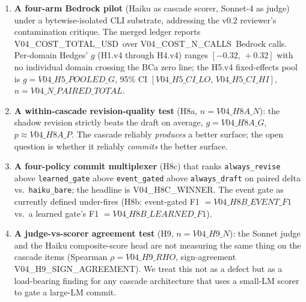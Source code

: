 \begin{enumerate}[leftmargin=2em,itemsep=2pt,topsep=2pt]
\item \textbf{A four-arm Bedrock pilot} (Haiku as cascade scorer, Sonnet-4 as judge) under a bytewise-isolated CLI substrate, addressing the v0.2 reviewer's contamination critique. The merged ledger reports {V04\_COST\_TOTAL\_USD}~over {V04\_COST\_N\_CALLS}~Bedrock calls. Per-domain Hedges' $g$ (H1.v4 through H4.v4) ranges $[-0.32,\,+0.32]$ with no individual domain crossing the BCa zero line; the H5.v4 fixed-effects pool is $g={V04\_H5\_POOLED\_G}$, 95\% CI $[{V04\_H5\_CI\_LO},\,{V04\_H5\_CI\_HI}]$, $n={V04\_N\_PAIRED\_TOTAL}$.
\item \textbf{A within-cascade revision-quality test} (H8a, $n={V04\_H8A\_N}$): the shadow revision strictly beats the draft on average, $g={V04\_H8A\_G}$, $p\approx{V04\_H8A\_P}$. The cascade reliably \emph{produces} a better surface; the open question is whether it reliably \emph{commits} the better surface.
\item \textbf{A four-policy commit multiplexer} (H8c) that ranks \texttt{always\_revise} above \texttt{learned\_gate} above \texttt{event\_gated} above \texttt{always\_draft} on paired delta vs.\ \texttt{haiku\_bare}; the headline is {V04\_H8C\_WINNER}. The  event gate as currently defined under-fires (H8b: event-gated F1 $={V04\_H8B\_EVENT\_F1}$ vs.\ a learned gate's F1 $={V04\_H8B\_LEARNED\_F1}$).
\item \textbf{A judge-vs-scorer agreement test} (H9, $n={V04\_H9\_N}$): the Sonnet judge and the Haiku composite-score head are not measuring the same thing on the cascade items (Spearman $\rho={V04\_H9\_RHO}$, sign-agreement {V04\_H9\_SIGN\_AGREEMENT}). We treat this not as a defect but as a load-bearing finding for any cascade architecture that uses a small-LM scorer to gate a large-LM commit.
\end{enumerate}

